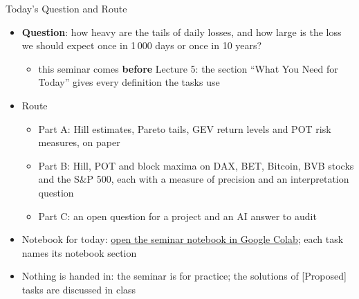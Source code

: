\begin{frame}{Today's Question and Route}
\itemsize{\small}
\begin{itemize}
    \item \textbf{Question}: how heavy are the tails of daily losses, and how large is the loss we should expect once in 1\,000 days or once in 10 years?
    \begin{itemize}
        \item this seminar comes \textbf{before} Lecture 5: the section ``What You Need for Today'' gives every definition the tasks use
    \end{itemize}
    \item Route
    \begin{itemize}
        \item Part A: Hill estimates, Pareto tails, GEV return levels and POT risk measures, on paper
        \item Part B: Hill, POT and block maxima on DAX, BET, Bitcoin, BVB stocks and the S\&P 500, each with a measure of precision and an interpretation question
        \item Part C: an open question for a project and an AI answer to audit
    \end{itemize}
    \item Notebook for today: \href{\nb}{open the seminar notebook in Google Colab}; each task names its notebook section
    \item Nothing is handed in: the seminar is for practice; the solutions of [Proposed] tasks are discussed in class
\end{itemize}
\end{frame}

